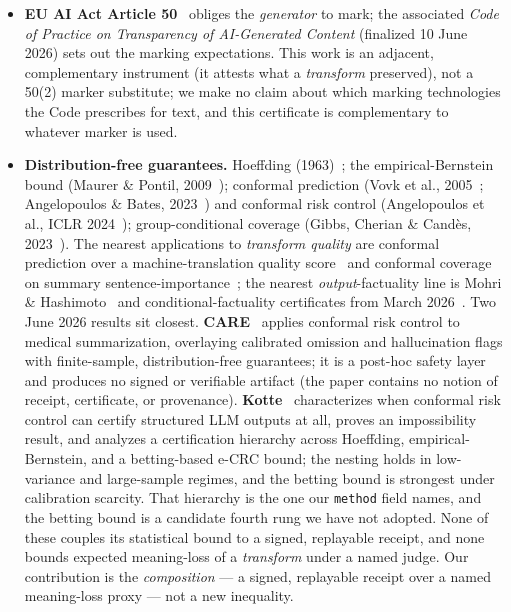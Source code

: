 \documentclass[11pt]{article}
\theoremstyle{definition}
\begin{document}
\begin{itemize}
  \texttt{sum.meaning\_risk\_receipt.v1} is a natural Signed Statement
  payload, and registering one would add third-party witnessing of
  \emph{occurrence} to the issuer-signed bound on \emph{meaning}. We have
  not implemented the \texttt{COSE\_Sign1} re-envelope; the current wire
  format is JWS over JCS bytes (\S\ref{sec:substrate}), and the mapping is
  future work (\S\ref{sec:limits}).
\item \textbf{EU AI Act Article 50}~\cite{euaiact} obliges the
  \emph{generator} to mark; the associated \emph{Code of Practice on
  Transparency of AI-Generated Content} (finalized 10 June 2026) sets out
  the marking expectations. This work is an adjacent, complementary
  instrument (it attests what a \emph{transform} preserved), not a 50(2)
  marker substitute; we make no claim about which marking technologies the
  Code prescribes for text, and this certificate is complementary to
  whatever marker is used.
\item \textbf{Distribution-free guarantees.} Hoeffding
  (1963)~\cite{hoeffding1963}; the empirical-Bernstein bound (Maurer \&
  Pontil, 2009~\cite{maurerpontil2009}); conformal prediction (Vovk et al.,
  2005~\cite{vovk2005}; Angelopoulos \& Bates,
  2023~\cite{angelopoulosbates2023}) and conformal risk control
  (Angelopoulos et al., ICLR 2024~\cite{angelopoulos2024crc});
  group-conditional coverage (Gibbs, Cherian \& Cand\`es,
  2023~\cite{gibbs2023}). The nearest applications to \emph{transform
  quality} are conformal prediction over a machine-translation quality
  score~\cite{giovannotti2023} and conformal coverage on summary
  sentence-importance~\cite{confsumm2025}; the nearest
  \emph{output}-factuality line is Mohri \& Hashimoto~\cite{mohri2024} and
  conditional-factuality certificates from March 2026~\cite{condfact2026}. Two
  June 2026 results sit closest. \textbf{CARE}~\cite{care2026} applies
  conformal risk control to medical summarization, overlaying calibrated
  omission and hallucination flags with finite-sample, distribution-free
  guarantees; it is a post-hoc safety layer and produces no signed or
  verifiable artifact (the paper contains no notion of receipt, certificate,
  or provenance). \textbf{Kotte}~\cite{kotte2026} characterizes when
  conformal risk control can certify structured LLM outputs at all, proves an
  impossibility result, and analyzes a certification hierarchy across
  Hoeffding, empirical-Bernstein, and a betting-based e-CRC bound; the nesting
  holds in low-variance and large-sample regimes, and the betting bound is
  strongest under calibration scarcity. That hierarchy is the one
  our \texttt{method} field names, and the betting bound is a candidate
  fourth rung we have not adopted. None of these couples its statistical
  bound to a signed, replayable receipt, and none bounds expected
  meaning-loss of a \emph{transform} under a named judge.
  Our contribution is the \emph{composition} --- a signed, replayable
  receipt over a named meaning-loss proxy --- not a new inequality.
\end{itemize}
\end{document}
